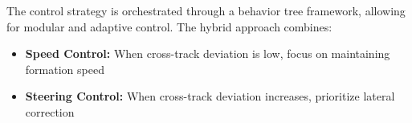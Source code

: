 

The control strategy is orchestrated through a behavior tree framework, allowing for modular and adaptive control. The hybrid approach combines:

\begin{itemize}
    \item \textbf{Speed Control:} When cross-track deviation is low, focus on maintaining formation speed
    \item \textbf{Steering Control:} When cross-track deviation increases, prioritize lateral correction
\end{itemize}